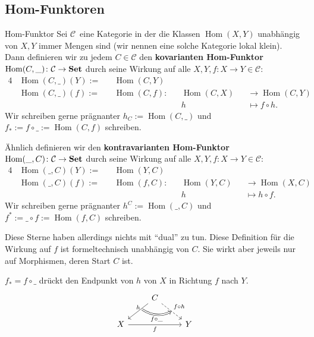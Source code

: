 \documentclass[a4paper]{amsart}
\theoremstyle{definition}
\DeclareMathOperator{\Hom}{Hom}
\newcommand{\CC}{\ensuremath{\mathcal{ C }}}
\newcommand{\Set}{\text{\textbf{Set}}}
\begin{document}
\subsection{Hom-Funktoren}
\begin{Definition}{Hom-Funktor}
   Sei \CC\ eine Kategorie in der die Klassen $\Hom(X,Y)$ unabhängig von $X,Y$ immer Mengen sind (wir nennen eine solche Kategorie lokal klein). Dann definieren wir zu jedem $C \in \CC$ den \textbf{kovarianten Hom-Funktor} $\Hom(C, \_) \colon \CC \to \Set$ durch seine Wirkung auf alle $X,Y, f \colon X \to Y \in \CC$:
   \begin{alignat}{4}
      &\Hom(C, \_)( Y ) := &&\Hom(C, Y)\\
      &\Hom(C, \_)( f ) := &&\Hom(C, f ) \colon &&\Hom(C, X ) &&\to \Hom(C, Y )\\
      &                    &&                   &&h           &&\mapsto f \circ h.
   \end{alignat}
   Wir schreiben gerne prägnanter $h_C := \Hom(C, \_)$ und  $f_* := f \circ \_ := \Hom(C, f )$ schreiben.

   Ähnlich definieren wir den \textbf{kontravarianten Hom-Funktor} $\Hom(\_, C) \colon \CC \to \Set$ durch seine Wirkung auf alle $X,Y, f \colon X \to Y \in \CC$:
   \begin{alignat}{4}
      &\Hom(\_, C)( Y ) := &&\Hom(Y, C)\\
      &\Hom(\_, C)( f ) := &&\Hom( f, C ) \colon &&\Hom(Y, C ) &&\to \Hom(X, C )\\
      &                    &&                   &&h           &&\mapsto h \circ f.
   \end{alignat}
   Wir schreiben gerne prägnanter $h^C := \Hom(\_, C)$ und  $f^* := \_ \circ f := \Hom( f, C )$ schreiben.
\end{Definition}
Diese Sterne haben allerdings nichts mit "`dual"' zu tun. Diese Definition für die Wirkung auf $f$ ist formeltechnisch unabhängig von $C$. Sie wirkt aber jeweils nur auf Morphismen, deren Start $C$ ist.

$f_* = f \circ \_$ drückt den Endpunkt von $h$ von $X$ in Richtung $f$ nach $Y$.
\begin{equation}
   \begin{tikzcd}
                         &C   \arrow[dl, "h"{above, name=0}] \arrow[dr, dashed, "f \circ h"{name=1}] \\
      X \arrow[rr, "f"{below}]  &        &Y
      \arrow[Rightarrow, bend right, from=0, to=1, "f \circ \_"{below}]
   \end{tikzcd}
\end{equation}
\end{document}
